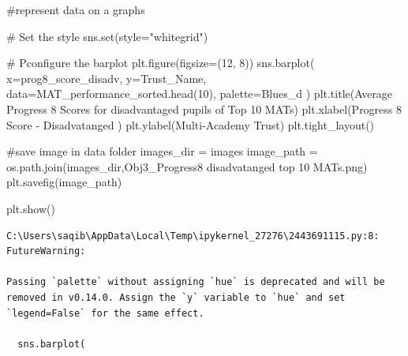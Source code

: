 \documentclass[
  letterpaper,
  DIV=11,
  numbers=noendperiod]{scrartcl}
\newenvironment{Shaded}{\begin{snugshade}}{\end{snugshade}}
\newcommand{\BuiltInTok}[1]{\textcolor[rgb]{0.00,0.23,0.31}{#1}}
\newcommand{\CommentTok}[1]{\textcolor[rgb]{0.37,0.37,0.37}{#1}}
\newcommand{\DecValTok}[1]{\textcolor[rgb]{0.68,0.00,0.00}{#1}}
\newcommand{\NormalTok}[1]{\textcolor[rgb]{0.00,0.23,0.31}{#1}}
\newcommand{\OperatorTok}[1]{\textcolor[rgb]{0.37,0.37,0.37}{#1}}
\newcommand{\StringTok}[1]{\textcolor[rgb]{0.13,0.47,0.30}{#1}}
\begin{document}
\begin{Shaded}
\begin{Highlighting}[]
\CommentTok{\#represent data on a graphs}

\CommentTok{\# Set the style }
\NormalTok{sns.}\BuiltInTok{set}\NormalTok{(style}\OperatorTok{=}\StringTok{"whitegrid"}\NormalTok{)}

\CommentTok{\# Pconfigure the barplot}
\NormalTok{plt.figure(figsize}\OperatorTok{=}\NormalTok{(}\DecValTok{12}\NormalTok{, }\DecValTok{8}\NormalTok{))}
\NormalTok{sns.barplot(}
\NormalTok{    x}\OperatorTok{=}\StringTok{\textquotesingle{}prog8\_score\_disadv\textquotesingle{}}\NormalTok{, }
\NormalTok{    y}\OperatorTok{=}\StringTok{\textquotesingle{}Trust\_Name\textquotesingle{}}\NormalTok{, }
\NormalTok{    data}\OperatorTok{=}\NormalTok{MAT\_performance\_sorted.head(}\DecValTok{10}\NormalTok{),}
\NormalTok{    palette}\OperatorTok{=}\StringTok{\textquotesingle{}Blues\_d\textquotesingle{}}
\NormalTok{)}
\NormalTok{plt.title(}\StringTok{\textquotesingle{}Average Progress 8 Scores for disadvantaged pupils of Top 10 MATs\textquotesingle{}}\NormalTok{)}
\NormalTok{plt.xlabel(}\StringTok{\textquotesingle{}Progress 8 Score {-} Disadvatanged \textquotesingle{}}\NormalTok{)}
\NormalTok{plt.ylabel(}\StringTok{\textquotesingle{}Multi{-}Academy Trust\textquotesingle{}}\NormalTok{)}
\NormalTok{plt.tight\_layout()}


\CommentTok{\#save image in data folder}
\NormalTok{images\_dir }\OperatorTok{=} \StringTok{\textquotesingle{}images\textquotesingle{}}
\NormalTok{image\_path }\OperatorTok{=}\NormalTok{ os.path.join(images\_dir,}\StringTok{\textquotesingle{}Obj3\_Progress8 disadvatanged top 10 MATs.png\textquotesingle{}}\NormalTok{)}
\NormalTok{plt.savefig(image\_path)}

\NormalTok{plt.show()}
\end{Highlighting}
\end{Shaded}

\begin{verbatim}
C:\Users\saqib\AppData\Local\Temp\ipykernel_27276\2443691115.py:8: FutureWarning: 

Passing `palette` without assigning `hue` is deprecated and will be removed in v0.14.0. Assign the `y` variable to `hue` and set `legend=False` for the same effect.

  sns.barplot(
\end{verbatim}
\end{document}
